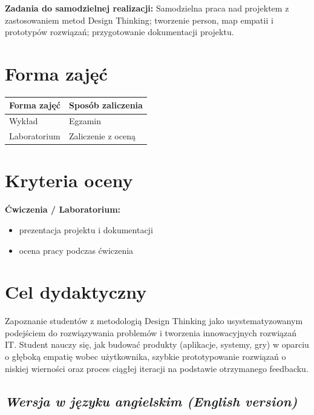 \documentclass[12pt, a4paper]{article}
\newcommand{\thdrule}{\noalign{\global\setlength{\extrarowheight}{0pt}}}
\newcommand{\thdend}{\noalign{\global\setlength{\extrarowheight}{3pt}}}
\begin{document}
\vspace{4pt}
\noindent\textbf{Zadania do samodzielnej realizacji:} Samodzielna praca nad projektem z zastosowaniem metod Design Thinking; tworzenie person, map empatii i prototypów rozwiązań; przygotowanie dokumentacji projektu.

\section{Forma zajęć}

\begin{center}
{\scriptsize
\begin{tabular}{m{5cm}m{8cm}}
\thdrule\toprule
\rowcolor{pjatkRed} {\color{white}\textbf{Forma zajęć}} & {\color{white}\textbf{Sposób zaliczenia}} \\
\midrule\thdend
  \rowcolor{tableRowLight} Wykład & Egzamin \\
  \rowcolor{tableRowAlt} Laboratorium & Zaliczenie z oceną \\
\bottomrule
\end{tabular}}
\end{center}

\section{Kryteria oceny}

\textbf{Ćwiczenia / Laboratorium:}
\begin{itemize}
  \item prezentacja projektu i dokumentacji
  \item ocena pracy podczas ćwiczenia
\end{itemize}


\section{Cel dydaktyczny}

Zapoznanie studentów z metodologią Design Thinking jako usystematyzowanym podejściem do rozwiązywania problemów i tworzenia innowacyjnych rozwiązań IT. Student nauczy się, jak budować produkty (aplikacje, systemy, gry) w oparciu o głęboką empatię wobec użytkownika, szybkie prototypowanie rozwiązań o niskiej wierności oraz proces ciągłej iteracji na podstawie otrzymanego feedbacku.

\subsection*{\textit{Wersja w języku angielskim (English version)}}
\end{document}
